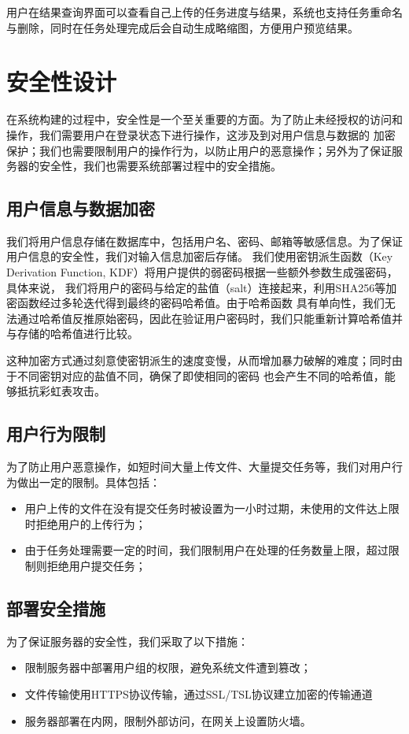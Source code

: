 用户在结果查询界面可以查看自己上传的任务进度与结果，系统也支持任务重命名与删除，同时在任务处理完成后会自动生成略缩图，方便用户预览结果。

\section{安全性设计}

在系统构建的过程中，安全性是一个至关重要的方面。为了防止未经授权的访问和操作，我们需要用户在登录状态下进行操作，这涉及到对用户信息与数据的
加密保护；我们也需要限制用户的操作行为，以防止用户的恶意操作；另外为了保证服务器的安全性，我们也需要系统部署过程中的安全措施。

\subsection{用户信息与数据加密}

我们将用户信息存储在数据库中，包括用户名、密码、邮箱等敏感信息。为了保证用户信息的安全性，我们对输入信息加密后存储。
我们使用密钥派生函数（Key Derivation Function, KDF）将用户提供的弱密码根据一些额外参数生成强密码，具体来说，
我们将用户的密码与给定的盐值（salt）连接起来，利用SHA256等加密函数经过多轮迭代得到最终的密码哈希值。由于哈希函数
具有单向性，我们无法通过哈希值反推原始密码，因此在验证用户密码时，我们只能重新计算哈希值并与存储的哈希值进行比较。

这种加密方式通过刻意使密钥派生的速度变慢，从而增加暴力破解的难度；同时由于不同密钥对应的盐值不同，确保了即使相同的密码
也会产生不同的哈希值，能够抵抗彩虹表攻击。

\subsection{用户行为限制}

为了防止用户恶意操作，如短时间大量上传文件、大量提交任务等，我们对用户行为做出一定的限制。具体包括：
\begin{itemize}
    \item 用户上传的文件在没有提交任务时被设置为一小时过期，未使用的文件达上限时拒绝用户的上传行为；
    \item 由于任务处理需要一定的时间，我们限制用户在处理的任务数量上限，超过限制则拒绝用户提交任务；
\end{itemize}

\subsection{部署安全措施}

为了保证服务器的安全性，我们采取了以下措施：
\begin{itemize}
    \item 限制服务器中部署用户组的权限，避免系统文件遭到篡改；
    \item 文件传输使用HTTPS协议传输，通过SSL/TSL协议建立加密的传输通道
    \item 服务器部署在内网，限制外部访问，在网关上设置防火墙。
\end{itemize}